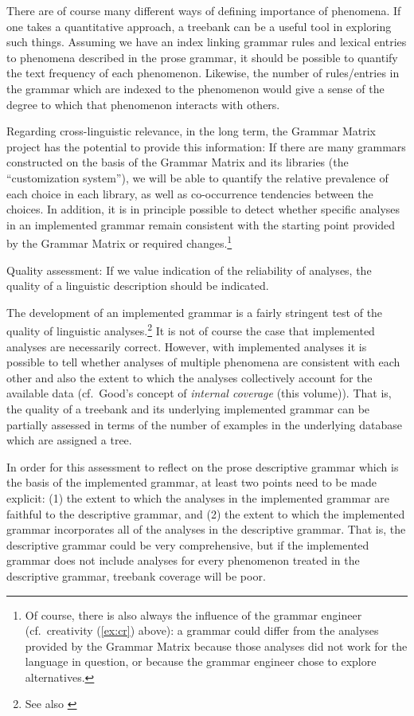 There are of course many different ways of defining importance
of phenomena.  If one takes a quantitative approach, a treebank can
be a useful tool in exploring such things. Assuming we have an index
linking grammar rules and lexical entries to phenomena described in the
prose grammar, it should be possible to quantify the text
frequency of each phenomenon.  Likewise, the number of rules/entries
in the grammar which are indexed to the phenomenon would give a 
sense of the degree to which that phenomenon interacts with others.

Regarding cross-linguistic relevance, in the long term, the Grammar
Matrix project has the potential to provide this information:  If
there are many grammars constructed on the basis of the Grammar
Matrix and its libraries (the ``customization system''), we will
be able to quantify the relative prevalence of each choice in each
library, as well as co-occurrence tendencies between the choices.
In addition, it is in principle possible to detect whether 
specific analyses in an implemented grammar remain consistent with
the starting point provided by the Grammar Matrix or required changes.\footnote{Of course, there is also always the influence of the grammar engineer
(cf.\ {\sc creativity} (\ref{ex:cr}) above): a grammar could differ
from the analyses provided by the Grammar Matrix because those analyses
did not work for the language in question, or because the grammar
engineer chose to explore alternatives.}

\begin{exe}
\ex\label{ex:qa} {\sc Quality assessment:} If we value indication of
the reliability of analyses, the quality of a linguistic description
should be indicated.
\end{exe}

The development of an implemented grammar is a fairly stringent test
of the quality of linguistic analyses.\footnote{See also \citet{Maxwelltv}} It is not of course the case
that implemented analyses are necessarily correct.  However, with
implemented analyses it is possible to tell whether analyses of
multiple phenomena are consistent with each other and also the extent
to which the analyses collectively account for the available data (cf.\
Good's concept of {\it internal coverage} (this volume)). \nocite{Good:tv}
That is, the quality of a treebank and its underlying implemented
grammar can be partially assessed in terms of the number of examples
in the underlying database which are assigned a tree.

In order for this assessment to reflect on the prose descriptive
grammar which is the basis of the implemented grammar, at least two
points need to be made explicit: (1) the extent to which the analyses
in the implemented grammar are faithful to the descriptive grammar, and
(2) the extent to which the implemented grammar incorporates all of the
analyses in the descriptive grammar.  That is, the descriptive grammar
could be very comprehensive, but if the implemented grammar does not
include analyses for every phenomenon treated in the descriptive
grammar, treebank coverage will be poor.

